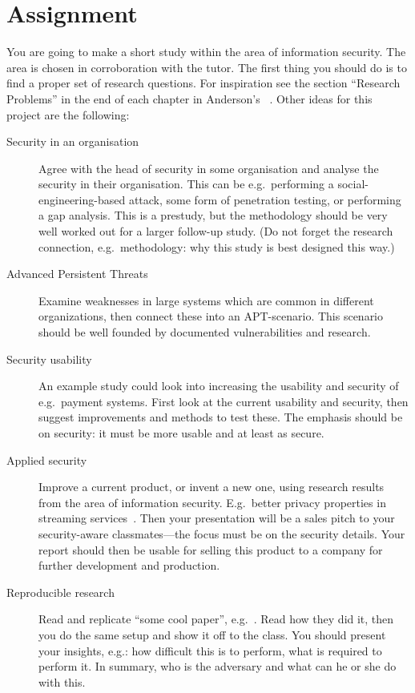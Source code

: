 \documentclass[a4paper]{llncs}
\begin{document}
\section{Assignment}
\label{sec:work}
You are going to make a short study within the area of information security.
The area is chosen in corroboration with the tutor.
The first thing you should do is to find a proper set of research questions.
For inspiration see the section \enquote{Research Problems} in the end of each 
chapter in Anderson's ~\cite{Anderson2008sea}.
Other ideas for this project are the following:
\begin{description}
  \item[Security in an organisation]
    Agree with the head of security in some organisation and analyse the 
    security in their organisation.
    This can be e.g.~performing a social-engineering-based attack, some form of 
    penetration testing, or performing a gap analysis.
    This is a prestudy, but the methodology should be very well worked out for 
    a larger follow-up study.
    (Do not forget the research connection, e.g.~methodology: why this study is 
    best designed this way.)

  \item[Advanced Persistent Threats]
    Examine weaknesses in large systems which are common in different 
    organizations, then connect these into an APT-scenario.
    This scenario should be well founded by documented vulnerabilities and 
    research.

  \item[Security usability]
    An example study could look into increasing the usability and security of 
    e.g.~payment systems.
    First look at the current usability and security, then suggest improvements 
    and methods to test these.
    The emphasis should be on security: it must be more usable and at least as 
    secure.

  \item[Applied security]
    Improve a current product, or invent a new one, using research results from 
    the area of information security.
    E.g.~better privacy properties in streaming services~\cite{anonpass}.
    Then your presentation will be a sales pitch to your security-aware 
    classmates---the focus must be on the security details.
    Your report should then be usable for selling this product to a company for 
    further development and production.

  \item[Reproducible research]
    Read and replicate \enquote{some cool paper}, e.g.~\cite{acoustic}.
    Read how they did it, then you do the same setup and show it off to the 
    class.
    You should present your insights, e.g.:
    how difficult this is to perform,
    what is required to perform it.
    In summary, who is the adversary and what can he or she do with this.
\end{description}
\end{document}
